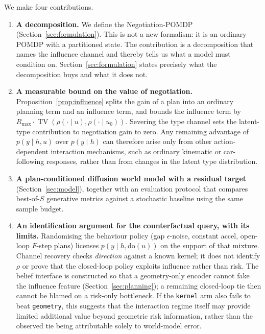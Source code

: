 \documentclass[conference]{IEEEtran}
\DeclareMathOperator{\TV}{TV}
\begin{document}
We make four contributions.

\begin{enumerate}\itemsep2pt
\item \textbf{A decomposition.} We define the
Negotiation-POMDP (Section~\ref{sec:formulation}). This is not a new
formalism: it is an ordinary POMDP with a partitioned state. The contribution
is a decomposition that names the influence channel and thereby tells us what a
model must condition on. Section~\ref{sec:formulation} states precisely what the
decomposition buys and what it does not.

\item \textbf{A measurable bound on the value of negotiation.}
Proposition~\ref{prop:influence} splits the gain of a plan into an ordinary
planning term and an influence term, and bounds the influence term by $R_{\max}
\cdot \TV(\rho(\cdot \mid u), \rho(\cdot \mid u_0))$. Severing the type channel sets the latent-type contribution to negotiation gain to zero. Any remaining advantage of $p(y\mid h,u)$ over $p(y\mid h)$ can therefore arise only from other action-dependent interaction mechanisms, such as ordinary kinematic or car-following responses, rather than from changes in the latent type distribution.

\item \textbf{A plan-conditioned diffusion world model with a residual target}
(Section~\ref{sec:model}), together with an evaluation protocol that compares best-of-$S$ generative metrics against a stochastic baseline using the same sample budget.

\item \textbf{An identification argument for the counterfactual query, with
its limits.} Randomising the behaviour policy (gap $\epsilon$-noise, constant
accel, open-loop $F$-step plans) licenses $p(y \mid h, \mathrm{do}(u))$ on the
support of that mixture. Channel recovery checks \emph{direction} against a
known kernel; it does not identify $\rho$ or prove that the closed-loop policy
exploits influence rather than risk. The belief interface is constructed so
that a geometry-only encoder cannot fake the influence feature
(Section~\ref{sec:planning}); a remaining closed-loop tie then cannot be blamed
on a risk-only bottleneck. If the \texttt{kernel} arm also fails to beat \texttt{geometry}, this suggests that the interaction regime itself may provide limited additional value beyond geometric risk information, rather than the observed tie being attributable solely to world-model error.

\end{enumerate}
\end{document}

